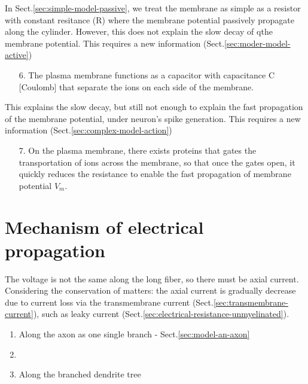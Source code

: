 In Sect.\ref{sec:simple-model-passive}, we treat the membrane as simple as a
resistor with constant resitance (R) where the membrane potential passively
propagate along the cylinder. However, this does not explain the slow decay of
qthe membrane potential. This requires a new information
(Sect.\ref{sec:moder-model-active})

\begin{enumerate}
  \item [6.] The plasma membrane functions as a capacitor with capacitance C
  [Coulomb] that separate the ions on each side of the membrane.  
\end{enumerate}
This explains the slow decay, but still not enough to explain the fast
propagation of the membrane potential, under neuron's spike generation. 
This requires a new information (Sect.\ref{sec:complex-model-action})
\begin{enumerate}
  \item [7.] On the plasma membrane, there exists proteins that gates the
  transportation of ions across the membrane, so that once the gates open, it
  quickly reduces the resistance to enable the fast propagation of membrane
  potential $V_m$.
\end{enumerate}

\section{Mechanism of electrical propagation}

The voltage is not the same along the long fiber, so there must be axial
current. Considering the conservation of matters: the axial current is gradually
decrease due to current loss via the transmembrane current
(Sect.\ref{sec:transmembrane-current}), such as leaky current
(Sect.\ref{sec:electrical-resistance-unmyelinated}).

\begin{enumerate}
  \item Along the axon as one single branch - Sect.\ref{sec:model-an-axon}
  \item 
   
  \item Along the branched dendrite tree
\end{enumerate}

